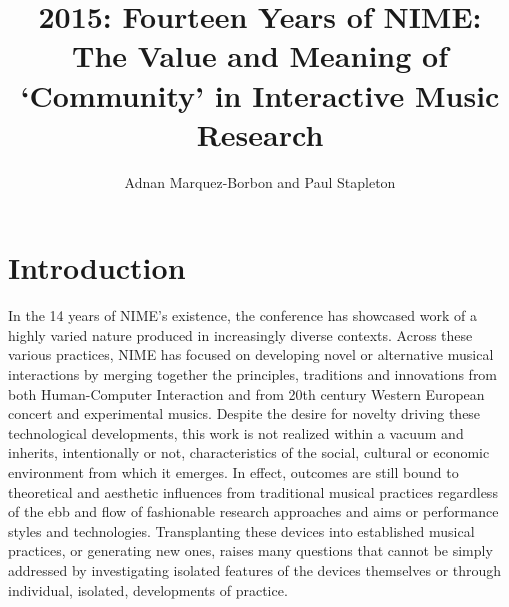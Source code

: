 \graphicspath{ {mainmatter/Marquez-Borbon_2015/} }

\title*{2015: Fourteen Years of NIME: The Value and Meaning of `Community' in Interactive Music Research}

\author{Adnan Marquez-Borbon and Paul Stapleton}

%
%
\maketitle


\section{Introduction}
In the 14 years of NIME's existence, the conference has showcased work of a highly varied nature produced in increasingly diverse contexts. Across these various practices, NIME has focused on developing novel or alternative musical interactions by merging together the principles, traditions and innovations from both Human-Computer Interaction and from 20th century Western European concert and experimental musics. Despite the desire for novelty driving these technological developments, this work is not realized within a vacuum and inherits, intentionally or not, characteristics of the social, cultural or economic environment from which it emerges. In effect, outcomes are still bound to theoretical and aesthetic influences from traditional musical practices regardless of the ebb and flow of fashionable research approaches and aims or performance styles and technologies. Transplanting these devices into established musical practices, or generating new ones, raises many questions that cannot be simply addressed by investigating isolated features of the devices themselves or through individual, isolated, developments of practice. 

